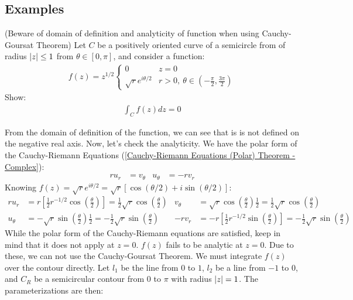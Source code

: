 \documentclass[12pt, english]{book}
\makeatletter
\renewenvironment{proof}[1][\proofname]{\par
	\pushQED{\qed}%
	\normalfont \topsep6\p@\@plus6\p@\relax
	\list{}{%
		\settowidth{\leftmargin}{\itshape\proofname:\hskip\labelsep}%
		\setlength{\labelwidth}{0pt}%
		\setlength{\itemindent}{-\leftmargin}%
	}%
	\item[\hskip\labelsep\itshape#1\@addpunct{:}]\ignorespaces
}{%
	\popQED\endlist\@endpefalse
}
\makeatother
\begin{document}
	\subsection{Examples} 
	
	\begin{example}(Beware of domain of definition and analyticity of function when using Cauchy-Goursat Theorem)
		Let \(C\) be a positively oriented curve of a semicircle from of radius \(\abs{z} \leq 1\) from \(\theta \in [0, \pi]\), and consider a function:
		\begin{align*}
			f(z) = z^{1/2}
			\begin{cases}
				0 & z = 0 \\
				\sqrt{r} e^{i\theta/2} & r>0, \ \theta \in \left(-\frac{\pi}{2}, \frac{3\pi}{2}\right)
			\end{cases}
		\end{align*}
		Show:
		\begin{align*}
			\int_{C} f(z) dz = 0
		\end{align*}
		\begin{proof}
			{\color{Grey}
			From the domain of definition of the function, we can see that is is not defined on the negative real axis. Now, let's check the analyticity. We have the polar form of the Cauchy-Riemann Equations (\cref{Cauchy-Riemann Equations (Polar) Theorem - Complex}):
			\begin{align*}
				ru_r &= v_\theta &
				u_\theta &= -rv_r
			\end{align*}
			Knowing \(f(z) = \sqrt{r}e^{i\theta/2} = \sqrt{r}[\cos(\theta/2) + i \sin(\theta/2)]\):
			\begin{align*}
				r u_r &= r\left[\frac{1}{2}r^{-1/2} \cos\left(\frac{\theta}{2}\right)\right]
						= \frac{1}{2}\sqrt{r} \cos\left(\frac{\theta}{2}\right) &
				v_\theta &= \sqrt{r} \cos\left(\frac{\theta}{2}\right) \frac{1}{2} 
							= \frac{1}{2}\sqrt{r}\cos\left(\frac{\theta}{2}\right) \\
				u_\theta &= -\sqrt{r}\sin\left(\frac{\theta}{2}\right) \frac{1}{2}
							= - \frac{1}{2} \sqrt{r} \sin\left(\frac{\theta}{2}\right) &
				-rv_r &= -r \left[\frac{1}{2} r^{-1/2} \sin\left(\frac{\theta}{2}\right)\right]
						= -\frac{1}{2} \sqrt{r} \sin\left(\frac{\theta}{2}\right)
			\end{align*}
			While the polar form of the Cauchy-Riemann equations are satisfied, keep in mind that it does not apply at \(z=0\). \(f(z)\) fails to be analytic at \(z=0\). Due to these, we can not use the Cauchy-Goursat Theorem. We must integrate \(f(z)\) over the contour directly. Let \(l_1\) be the line from \(0\) to \(1\), \(l_2\) be a line from \(-1\) to \(0\), and \(C_R\) be a semicircular contour from \(0\) to \(\pi\) with radius \(\abs{z}=1\). The parameterizations are then: 
}
\end{proof}
\end{example}
\end{document}
